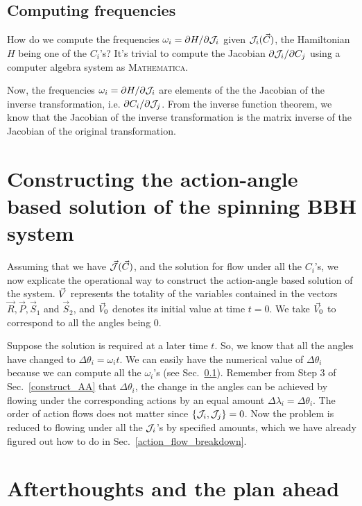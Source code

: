 \subsection{Computing frequencies}    \label{compute_freq}


How do we compute the frequencies $\omega_i = \partial H/\partial \mathcal{J}_i$ given 
$\mathcal{J}_i(\vec{C})$, the Hamiltonian $H$ being one of the $C_i$'s?
It's trivial to compute the Jacobian $\partial \mathcal{J}_i/\partial C_j$ using 
a computer algebra system as \textsc{Mathematica}. 


Now, the frequencies $\omega_i = \partial H/\partial \mathcal{J}_i$ are elements of the 
the Jacobian of the inverse transformation, i.e. 
$\partial C_i/\partial \mathcal{J}_j$. From the inverse function theorem, we know 
that the Jacobian of the inverse transformation is the matrix 
inverse of the Jacobian of the original transformation.




\section{Constructing the action-angle based solution of the spinning BBH system}


Assuming that we have $\vec{\mathcal{J}}(\vec{C})$, and the solution for flow under
all the $C_i$'s, we now explicate the operational way to construct the
action-angle based solution of the system. $\vec{V}$ represents the totality of
the variables contained in the vectors $\vec{R}, \vec{P}, \vec{S}_1$ and $\vec{S}_2$,
and $\vec{V}_0$ denotes its initial value at time $t=0$.
We take $\vec{V}_0$ to correspond to all the angles being 0.


Suppose the solution is required at  a later time $t$. So, we know that
all the angles have changed to $\Delta \theta_i = \omega_i t$. 
We can easily have the numerical value of $\Delta \theta_i$ because we 
can compute all the $\omega_i$'s (see Sec.~\ref{compute_freq}).
Remember from Step 3 of Sec.~\ref{construct_AA}
that $\Delta \theta_i$, the change in the angles can be achieved by flowing 
under the corresponding actions by an equal amount
$\Delta \lambda_i = \Delta \theta_i$. The order of action flows does not matter
since $\left\lbrace \mathcal{J}_i, \mathcal{J}_j \right\rbrace = 0$. Now the problem is reduced to flowing 
under all the $\mathcal{J}_i$'s by specified amounts, which we have
already figured out how to do in Sec.~\ref{action_flow_breakdown}.





\section{Afterthoughts and the plan ahead}



